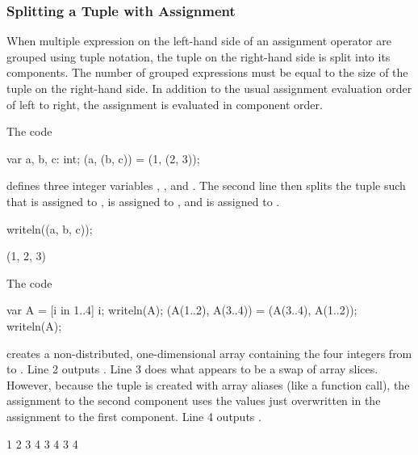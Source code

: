 \subsubsection{Splitting a Tuple with Assignment}

When multiple expression on the left-hand side of an assignment
operator are grouped using tuple notation, the tuple on the right-hand
side is split into its components.  The number of grouped expressions
must be equal to the size of the tuple on the right-hand side.  In
addition to the usual assignment evaluation order of left to right,
the assignment is evaluated in component order.

\begin{example}
\begin{chapelpre}
\end{chapelpre}
The code
\begin{chapel}
var a, b, c: int;
(a, (b, c)) = (1, (2, 3));
\end{chapel}
defines three integer variables , , and .  The
second line then splits the tuple  such that 
is assigned to ,  is assigned to ,
and  is assigned to .
\begin{chapelpost}
writeln((a, b, c));
\end{chapelpost}
\begin{chapeloutput}
(1, 2, 3)
\end{chapeloutput}
\end{example}

\begin{example}
\begin{chapelpre}
\end{chapelpre}
The code
\begin{chapel}
var A = [i in 1..4] i;
writeln(A);
(A(1..2), A(3..4)) = (A(3..4), A(1..2));
writeln(A);
\end{chapel}
creates a non-distributed, one-dimensional array containing the four
integers from  to .  Line 2 outputs .
Line 3 does what appears to be a swap of array slices.  However,
because the tuple is created with array aliases (like a function
call), the assignment to the second component uses the values just
overwritten in the assignment to the first component.  Line 4
outputs .
\begin{chapelpost}
\end{chapelpost}
\begin{chapeloutput}
1 2 3 4
3 4 3 4
\end{chapeloutput}
\end{example}

